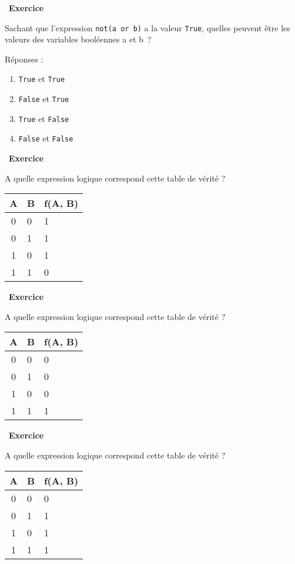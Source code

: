 \documentclass[
  11pt,
]{article}
\newcommand{\passthrough}[1]{#1}
\providecommand{\tightlist}{%
  \setlength{\itemsep}{0pt}\setlength{\parskip}{0pt}}
\newcounter{exo}
\newenvironment{exercice}[1]
{\par \medskip   \addtocounter{exo}{1} \noindent  
\begin{bclogo}[arrondi =0.1,   noborder = true, logo=\bccrayon, marge=4]{~\textbf{Exercice} \textbf{\theexo} {\itshape #1} }  \par}
{
\end{bclogo}
 \par \bigskip }
\newcounter{def}
\newcounter{logi}
\begin{document}
\begin{exercice}{}

Sachant que l'expression \passthrough{\lstinline!not(a or b)!} a la
valeur \passthrough{\lstinline!True!}, quelles peuvent être les valeurs
des variables booléennes a et b~?

Réponses :

\begin{enumerate}
\def\labelenumi{\arabic{enumi}.}
\tightlist
\item
  \passthrough{\lstinline!True!} et \passthrough{\lstinline!True!}
\item
  \passthrough{\lstinline!False!} et \passthrough{\lstinline!True!}
\item
  \passthrough{\lstinline!True!} et \passthrough{\lstinline!False!}
\item
  \passthrough{\lstinline!False!} et \passthrough{\lstinline!False!}
\end{enumerate}

\end{exercice}

\begin{exercice}{}

A quelle expression logique correspond cette table de vérité ?

\begin{longtable}[]{@{}cll@{}}
\toprule
A & B & f(A, B)\tabularnewline
\midrule
\endhead
0 & 0 & 1\tabularnewline
0 & 1 & 1\tabularnewline
1 & 0 & 1\tabularnewline
1 & 1 & 0\tabularnewline
\bottomrule
\end{longtable}

\end{exercice}

\begin{exercice}{}

A quelle expression logique correspond cette table de vérité ?

\begin{longtable}[]{@{}cll@{}}
\toprule
A & B & f(A, B)\tabularnewline
\midrule
\endhead
0 & 0 & 0\tabularnewline
0 & 1 & 0\tabularnewline
1 & 0 & 0\tabularnewline
1 & 1 & 1\tabularnewline
\bottomrule
\end{longtable}

\end{exercice}

\begin{exercice}{}

A quelle expression logique correspond cette table de vérité ?

\begin{longtable}[]{@{}cll@{}}
\toprule
A & B & f(A, B)\tabularnewline
\midrule
\endhead
0 & 0 & 0\tabularnewline
0 & 1 & 1\tabularnewline
1 & 0 & 1\tabularnewline
1 & 1 & 1\tabularnewline
\bottomrule
\end{longtable}

\end{exercice}
\end{document}
